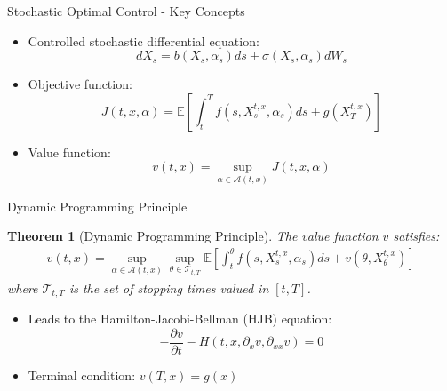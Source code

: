 \documentclass{beamer}
\newtheorem{theorem}{Theorem}
\begin{document}
\begin{frame}{Stochastic Optimal Control - Key Concepts}
\begin{itemize}
    \item Controlled stochastic differential equation:
    \begin{equation}
        d X_s = b(X_s, \alpha_s)ds + \sigma(X_s, \alpha_s) d W_s
    \end{equation}
    \item Objective function:
    \begin{equation}
        J(t, x, \alpha) = \mathbb{E}\left[ \int_t^T f(s, X_s^{t,x}, \alpha_s) ds + g(X^{t,x}_T) \right]
    \end{equation}
    \item Value function:
    \begin{equation}
        v(t,x) = \sup_{\alpha \in \mathcal{A}(t,x)} J(t,x,\alpha)
    \end{equation}
\end{itemize}
\end{frame}

\begin{frame}{Dynamic Programming Principle}
\begin{theorem}[Dynamic Programming Principle]
    The value function $v$ satisfies:
    \begin{gather} 
        v(t,x) = \sup_{\alpha \in \mathcal{A}(t,x)}
        \sup_{\theta \in \mathcal{T}_{t,T}}
        \mathbb{E}\left[ \int_t^\theta f(s, X_s^{t,x}, \alpha_s) ds + v(\theta, X^{t,x}_\theta) \right]
    \end{gather}
    where $\mathcal{T}_{t, T}$ is the set of stopping times valued in $[t,T]$.
\end{theorem}

\begin{itemize}
    \item Leads to the Hamilton-Jacobi-Bellman (HJB) equation:
    \begin{equation}
        -\frac{\partial v}{\partial t} - H(t,x,\partial_x v, \partial_{xx} v) = 0
    \end{equation}
    \item Terminal condition: $v(T,x) = g(x)$
\end{itemize}
\end{frame}
\end{document}
